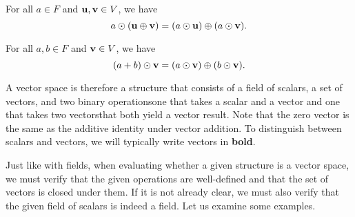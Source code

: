 \begin{definition}
\begin{enumerate}
    For all $ a\in F $ and $ \mathbf{u},\mathbf{v}\in V $, we have
    \begin{equation*}
        a\odot(\mathbf{u}\oplus\mathbf{v})=(a\odot\mathbf{u})\oplus(a\odot\mathbf{v}).
    \end{equation*}

    For all $ a,b\in F $ and $ \mathbf{v}\in V $, we have
    \begin{equation*}
        (a+b)\odot\mathbf{v}=(a\odot\mathbf{v})\oplus(b\odot\mathbf{v}).
    \end{equation*}
\end{enumerate}
\end{definition}

A vector space is therefore a structure that consists of a field of scalars, a set of vectors, and two binary operations\textemdash one that takes a scalar and a vector and one that takes two vectors\textemdash that both yield a vector result. Note that the zero vector is the same as the additive identity under vector addition. To distinguish between scalars and vectors, we will typically write vectors in \textbf{bold}.

Just like with fields, when evaluating whether a given structure is a vector space, we must verify that the given operations are well-defined and that the set of vectors is closed under them. If it is not already clear, we must also verify that the given field of scalars is indeed a field. Let us examine some examples.

